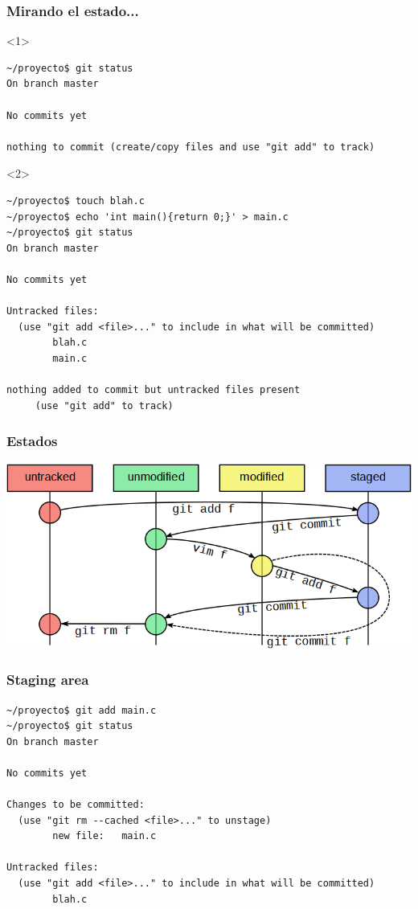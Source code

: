 \documentclass[a4paper, 12pt, aspectratio=169,
\ifhandout handout \else \fi
]{beamer}
\begin{document}
\begin{frame}[fragile]
    \frametitle{Mirando el estado...}
    \begin{onlyenv}<1>
    \begin{lstlisting}
~/proyecto$ git status
On branch master

No commits yet

nothing to commit (create/copy files and use "git add" to track)
    \end{lstlisting}
    \end{onlyenv}
    \begin{onlyenv}<2>
    \begin{lstlisting}
~/proyecto$ touch blah.c
~/proyecto$ echo 'int main(){return 0;}' > main.c
~/proyecto$ git status
On branch master

No commits yet

Untracked files:
  (use "git add <file>..." to include in what will be committed)
        blah.c
        main.c

nothing added to commit but untracked files present
     (use "git add" to track)
    \end{lstlisting}
    \end{onlyenv}
\end{frame}

\begin{frame}[fragile]
    \frametitle{Estados}
    \begin{center}
    \includegraphics[keepaspectratio, height=0.8\textheight, width=\linewidth]{estados.png}
    \end{center}
\end{frame}

\begin{frame}[fragile]
    \frametitle{Staging area}
\begin{lstlisting}
~/proyecto$ git add main.c
~/proyecto$ git status
On branch master

No commits yet

Changes to be committed:
  (use "git rm --cached <file>..." to unstage)
        new file:   main.c

Untracked files:
  (use "git add <file>..." to include in what will be committed)
        blah.c
\end{lstlisting}
\end{frame}
\end{document}
